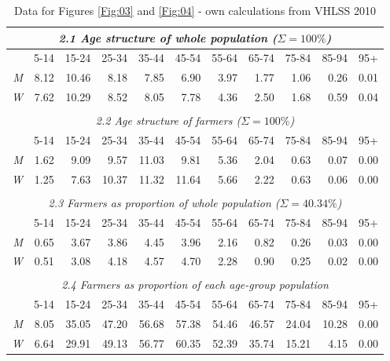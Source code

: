 \documentclass{article}
\begin{document}
\begin{table}[htbp!]
\caption{Data for Figures \ref{Fig:03} and \ref{Fig:04} - own calculations from VHLSS 2010}\label{Tab:01}
\centering
\begin{tabular}{rr rrrrrrrrr}
\\
\multicolumn{11}{c}{\emph{2.1 Age structure of whole population ($\Sigma = 100 \%$)}}\\
\hline
& 5-14 & 15-24 & 25-34 & 35-44 & 45-54 & 55-64 & 65-74 & 75-84 & 85-94 & 95+ \\ 
  \hline
\emph{M} & 8.12 & 10.46 & 8.18 & 7.85 & 6.90 & 3.97 & 1.77 & 1.06 & 0.26 & 0.01 \\ 
\emph{W} & 7.62 & 10.29 & 8.52 & 8.05 & 7.78 & 4.36 & 2.50 & 1.68 & 0.59 & 0.04 \\ 
\\
\multicolumn{11}{c}{\emph{2.2 Age structure of farmers ($\Sigma = 100 \%$)}}\\
\hline
& 5-14 & 15-24 & 25-34 & 35-44 & 45-54 & 55-64 & 65-74 & 75-84 & 85-94 & 95+ \\ 
  \hline
\emph{M} & 1.62 & 9.09 & 9.57 & 11.03 & 9.81 & 5.36 & 2.04 & 0.63 & 0.07 & 0.00 \\ 
\emph{W} & 1.25 & 7.63 & 10.37 & 11.32 & 11.64 & 5.66 & 2.22 & 0.63 & 0.06 & 0.00 \\ 
\hline
\\
\multicolumn{11}{c}{\emph{2.3 Farmers as proportion of whole population ($\Sigma = 40.34 \%$)}}\\
\hline
& 5-14 & 15-24 & 25-34 & 35-44 & 45-54 & 55-64 & 65-74 & 75-84 & 85-94 & 95+ \\ 
\hline
\emph{M} & 0.65 & 3.67 & 3.86 & 4.45 & 3.96 & 2.16 & 0.82 & 0.26 & 0.03 & 0.00 \\ 
\emph{W}& 0.51 & 3.08 & 4.18 & 4.57 & 4.70 & 2.28 & 0.90 & 0.25 & 0.02 & 0.00 \\ 
\hline
\\
\multicolumn{11}{c}{\emph{2.4 Farmers as proportion of each age-group population}}\\
\hline
& 5-14 & 15-24 & 25-34 & 35-44 & 45-54 & 55-64 & 65-74 & 75-84 & 85-94 & 95+ \\ 
\hline
\emph{M} & 8.05 & 35.05 & 47.20 & 56.68 & 57.38 & 54.46 & 46.57 & 24.04 & 10.28 & 0.00 \\ 
\emph{W} & 6.64 & 29.91 & 49.13 & 56.77 & 60.35 & 52.39 & 35.74 & 15.21 & 4.15 & 0.00 \\ 
   \hline
\end{tabular}
\end{table}
\end{document}
